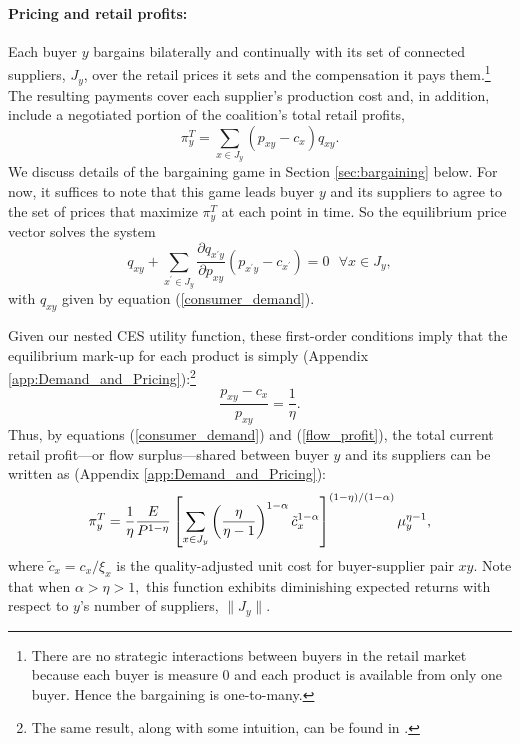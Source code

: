 \documentclass[12pt]{article} \usepackage{amsmath,amssymb,amsthm,geometry,graphicx,setspace,algorithm,algpseudocode,float}
\begin{document}
\paragraph{Pricing and retail profits:}  Each buyer $y$ bargains bilaterally and continually with its set of connected suppliers, $J_y$, over the retail prices it sets and the compensation it pays them.\footnote{There are no strategic interactions between buyers in the retail market because each buyer is measure 0 and each product is available from only one buyer. Hence the bargaining is one-to-many.\medskip} The resulting payments cover each supplier's production cost and, in addition, include a negotiated portion of the coalition's total retail profits, 
\begin{equation} 
\pi_y^T =\sum_{x\in J_y}(p_{xy}-c_{x})q_{xy}. 
\label{flow_profit}
\end{equation}
We discuss details of the bargaining game in Section \ref{sec:bargaining} below. For now, it suffices to note that this game leads buyer $y$ and its suppliers to agree to the set of prices that maximize $\pi^T_y$ at each point in time. So the equilibrium price vector solves the system
\begin{equation}
q_{xy}+\sum_{x^{\prime }\in J_y}\frac{\partial q_{x^{\prime }y}}{\partial
p_{xy}}(p_{x^{\prime }y}-c_{x^{\prime }})=0\text{ \ \ \ }\forall x\in J_y,
\label{buyer_foc}
\end{equation}%
with $q_{xy}$ given by equation (\ref{consumer_demand}).
\par
Given our nested CES utility function, these first-order conditions imply that the equilibrium mark-up for each product is simply (Appendix \ref{app:Demand_and_Pricing}):\footnote{\label{foot:strategic_interaction}
The same result, along with some intuition, can be found in 
 \citet{HottmanReddingWeinstein2015}.\medskip} 
\begin{equation}
\frac{p_{xy}-c_{x}}{p_{xy}}=\frac{1}{\eta }.  \label{mark-up}
\end{equation}
Thus, by equations (\ref{consumer_demand}) and (\ref{flow_profit}), the total current retail profit---or flow surplus---shared between buyer $y$ and its suppliers can be written as (Appendix \ref{app:Demand_and_Pricing}):
\begin{equation}
\pi _{y}^{T}=\frac{1}{\eta}\frac{E}{P^{1-\eta }}\left[ \sum_{x\in J_y}\left( \frac{\eta }{\eta -1}\right) ^{1-\alpha }\tilde{c}_{x}^{1-\alpha }\right] ^{%
(1-\eta)/(1-\alpha)}\mu _{y}^{\eta -1},  \label{buyer_rev}
\end{equation}%
where $\tilde{c}_{x}=c_{x}/\xi _{x}$ is the quality-adjusted unit cost for buyer-supplier pair $xy$. Note that when  $\alpha >\eta >1,$  this function exhibits diminishing expected returns with respect to $y$'s number of suppliers, $\parallel J_y \parallel$.
\end{document}
